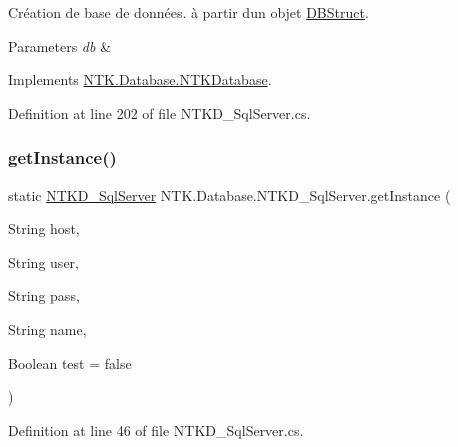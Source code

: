 Création de base de données. à partir d\textquotesingle{}un objet \mbox{\hyperlink{class_n_t_k_1_1_database_1_1_d_b_struct}{D\+B\+Struct}}. 


\begin{DoxyParams}{Parameters}
{\em db} & \\
\hline
\end{DoxyParams}


Implements \mbox{\hyperlink{class_n_t_k_1_1_database_1_1_n_t_k_database_aa5b7134f819469db92bd39b61c97ad90}{N\+T\+K.\+Database.\+N\+T\+K\+Database}}.



Definition at line 202 of file N\+T\+K\+D\+\_\+\+Sql\+Server.\+cs.

\mbox{\label{class_n_t_k_1_1_database_1_1_n_t_k_d___sql_server_ac1e15ce667398cb1232fa8099a43322c}} 
\subsubsection{\texorpdfstring{getInstance()}{getInstance()}}
{\footnotesize\ttfamily static \mbox{\hyperlink{class_n_t_k_1_1_database_1_1_n_t_k_d___sql_server}{N\+T\+K\+D\+\_\+\+Sql\+Server}} N\+T\+K.\+Database.\+N\+T\+K\+D\+\_\+\+Sql\+Server.\+get\+Instance (\begin{DoxyParamCaption}\item[{String}]{host,  }\item[{String}]{user,  }\item[{String}]{pass,  }\item[{String}]{name,  }\item[{Boolean}]{test = {\ttfamily false} }\end{DoxyParamCaption})\hspace{0.3cm}{\ttfamily [static]}}



Definition at line 46 of file N\+T\+K\+D\+\_\+\+Sql\+Server.\+cs.

\mbox{\label{class_n_t_k_1_1_database_1_1_n_t_k_d___sql_server_ae98329c8db3207bc0f68106ee5e817b9}} 
